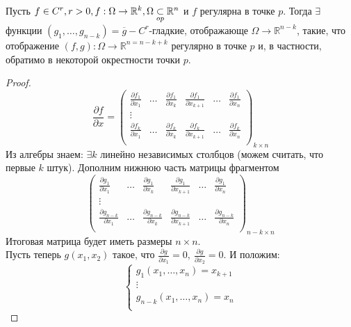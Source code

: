 \begin{theorem}
    Пусть $f \in C^r, r > 0, f:\Omega \to \mathbb{R}^k, \Omega \underset{op}{\subset} \mathbb{R}^n$ и $f$ регулярна в точке $p$.
    \newline
    Тогда $\exists$ функции $(g_1, \hdots, g_{n-k}) = \overline{g} - C^r$-гладкие, отображающе $\Omega \to \mathbb{R}^{n-k}$, такие, что отображение
    $(f, g): \Omega \to \mathbb{R}^{n = n-k + k}$ регулярно в точке $p$ и, в частности, обратимо в некоторой окрестности точки $p$.
    \begin{proof}
        \[\frac{\partial f}{\partial x} = \begin{pmatrix}
            \frac{\partial f_1}{\partial x_1} & \hdots & \frac{\partial f_1}{\partial x_k} & \frac{\partial f_1}{\partial x_{k+1}} & \hdots & \frac{\partial f_1}{\partial x_n} \\
            \vdots \\
            \frac{\partial f_k}{\partial x_1} & \hdots & \frac{\partial f_k}{\partial x_k} & \frac{\partial f_k}{\partial x_{k+1}} & \hdots & \frac{\partial f_k}{\partial x_n} \\
        \end{pmatrix}_{k \times n}
        \]
        Из алгебры знаем: $\exists k$ линейно независимых столбцов (можем считать, что первые $k$ штук). Дополним нижнюю часть матрицы фрагментом
        \[\begin{pmatrix}
            \frac{\partial g_1}{\partial x_1} & \hdots & \frac{\partial g_1}{\partial x_k} & \frac{\partial g_1}{\partial x_{k+1}} & \hdots & \frac{\partial g_1}{\partial x_n} \\
            \vdots \\
            \frac{\partial g_{n-k}}{\partial x_1} & \hdots & \frac{\partial g_{n-k}}{\partial x_k} & \frac{\partial g_{n-k}}{\partial x_{k+1}} & \hdots & \frac{\partial g_{n-k}}{\partial x_n} \\
        \end{pmatrix}_{n-k \times n}
        \]
        Итоговая матрица будет иметь размеры $n \times n$. \\
        Пусть теперь $g(x_1, x_2)$ такое, что $\frac{\partial g}{\partial x_1} = 0, \ \frac{\partial g}{\partial x_2} = 0$. И положим:
        \[\begin{cases}
            g_1(x_1, \hdots, x_n) = x_{k+1} \\
            \vdots \\
            g_{n-k}(x_1, \hdots, x_n) = x_n \\
        \end{cases}\]


\end{proof}
\end{theorem}
